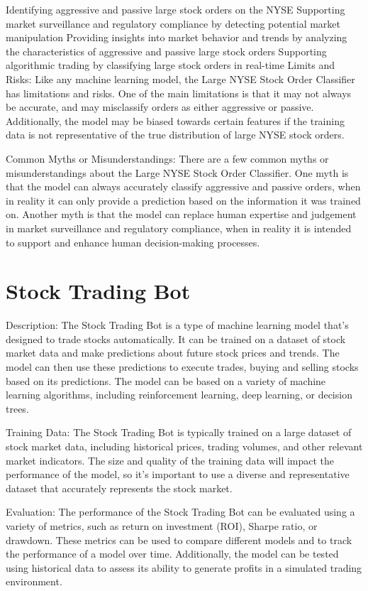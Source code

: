 Identifying aggressive and passive large stock orders on the NYSE
Supporting market surveillance and regulatory compliance by detecting potential market manipulation
Providing insights into market behavior and trends by analyzing the characteristics of aggressive and passive large stock orders
Supporting algorithmic trading by classifying large stock orders in real-time
Limits and Risks:
Like any machine learning model, the Large NYSE Stock Order Classifier has limitations and risks. One of the main limitations is that it may not always be accurate, and may misclassify orders as either aggressive or passive. Additionally, the model may be biased towards certain features if the training data is not representative of the true distribution of large NYSE stock orders.

Common Myths or Misunderstandings:
There are a few common myths or misunderstandings about the Large NYSE Stock Order Classifier. One myth is that the model can always accurately classify aggressive and passive orders, when in reality it can only provide a prediction based on the information it was trained on. Another myth is that the model can replace human expertise and judgement in market surveillance and regulatory compliance, when in reality it is intended to support and enhance human decision-making processes.

\section{Stock Trading Bot}

Description:
The Stock Trading Bot is a type of machine learning model that's designed to trade stocks automatically. It can be trained on a dataset of stock market data and make predictions about future stock prices and trends. The model can then use these predictions to execute trades, buying and selling stocks based on its predictions. The model can be based on a variety of machine learning algorithms, including reinforcement learning, deep learning, or decision trees.

Training Data:
The Stock Trading Bot is typically trained on a large dataset of stock market data, including historical prices, trading volumes, and other relevant market indicators. The size and quality of the training data will impact the performance of the model, so it's important to use a diverse and representative dataset that accurately represents the stock market.

Evaluation:
The performance of the Stock Trading Bot can be evaluated using a variety of metrics, such as return on investment (ROI), Sharpe ratio, or drawdown. These metrics can be used to compare different models and to track the performance of a model over time. Additionally, the model can be tested using historical data to assess its ability to generate profits in a simulated trading environment.

